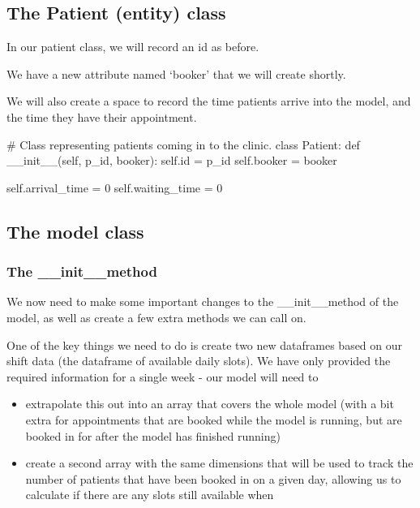 \documentclass[
  letterpaper,
  DIV=11,
  numbers=noendperiod]{scrreprt}
\newenvironment{Shaded}{\begin{snugshade}}{\end{snugshade}}
\newcommand{\BuiltInTok}[1]{\textcolor[rgb]{0.00,0.23,0.31}{#1}}
\newcommand{\CommentTok}[1]{\textcolor[rgb]{0.37,0.37,0.37}{#1}}
\newcommand{\DecValTok}[1]{\textcolor[rgb]{0.68,0.00,0.00}{#1}}
\newcommand{\FunctionTok}[1]{\textcolor[rgb]{0.28,0.35,0.67}{#1}}
\newcommand{\KeywordTok}[1]{\textcolor[rgb]{0.00,0.23,0.31}{#1}}
\newcommand{\NormalTok}[1]{\textcolor[rgb]{0.00,0.23,0.31}{#1}}
\newcommand{\OperatorTok}[1]{\textcolor[rgb]{0.37,0.37,0.37}{#1}}
\newcommand{\VariableTok}[1]{\textcolor[rgb]{0.07,0.07,0.07}{#1}}
\providecommand{\tightlist}{%
  \setlength{\itemsep}{0pt}\setlength{\parskip}{0pt}}\usepackage{longtable,booktabs,array}
\begin{document}
\subsection{The Patient (entity) class}\label{the-patient-entity-class}

In our patient class, we will record an id as before.

We have a new attribute named `booker' that we will create shortly.

We will also create a space to record the time patients arrive into the
model, and the time they have their appointment.

\begin{Shaded}
\begin{Highlighting}[]
\CommentTok{\# Class representing patients coming in to the clinic.}
\KeywordTok{class}\NormalTok{ Patient:}
    \KeywordTok{def} \FunctionTok{\_\_init\_\_}\NormalTok{(}\VariableTok{self}\NormalTok{, p\_id, booker):}
        \VariableTok{self}\NormalTok{.}\BuiltInTok{id} \OperatorTok{=}\NormalTok{ p\_id}
        \VariableTok{self}\NormalTok{.booker }\OperatorTok{=}\NormalTok{ booker}

        \VariableTok{self}\NormalTok{.arrival\_time }\OperatorTok{=} \DecValTok{0}
        \VariableTok{self}\NormalTok{.waiting\_time }\OperatorTok{=} \DecValTok{0}
\end{Highlighting}
\end{Shaded}

\subsection{The model class}\label{the-model-class-9}

\subsubsection{The \_\_init\_\_method}\label{the-__init__method}

We now need to make some important changes to the \_\_init\_\_method of
the model, as well as create a few extra methods we can call on.

One of the key things we need to do is create two new dataframes based
on our shift data (the dataframe of available daily slots). We have only
provided the required information for a single week - our model will
need to

\begin{itemize}
\tightlist
\item
  extrapolate this out into an array that covers the whole model (with a
  bit extra for appointments that are booked while the model is running,
  but are booked in for after the model has finished running)
\item
  create a second array with the same dimensions that will be used to
  track the number of patients that have been booked in on a given day,
  allowing us to calculate if there are any slots still available when
\end{itemize}
\end{document}
